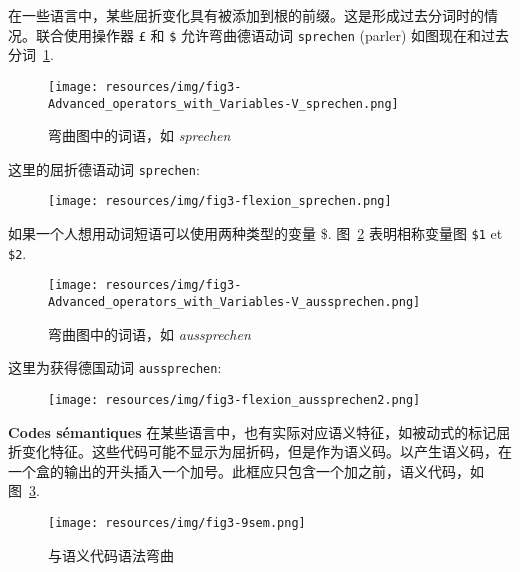 \noindent 在一些语言中，某些屈折变化具有被添加到根的前缀。这是形成过去分词时的情况。联合使用操作器 \verb+£+ 和 \verb+$+ 允许弯曲德语动词 \verb+sprechen+ (parler)
如图现在和过去分词~\ref{fig-inflection-sprechen}.

\newpage
\begin{figure}[!htbp]
\begin{center}
\texttt{[image: resources/img/fig3-Advanced\_operators\_with\_Variables-V\_sprechen.png]}
\caption{弯曲图中的词语，如 {\it sprechen}
\label{fig-inflection-sprechen}}
\end{center}
\end{figure}

\noindent 这里的屈折德语动词 \verb+sprechen+:

\bigskip
\begin{figure}[!ht]
\begin{center}
\texttt{[image: resources/img/fig3-flexion\_sprechen.png]}
\end{center}
\end{figure}

\noindent 如果一个人想用动词短语可以使用两种类型的变量 \$.
图~\ref{fig-inflection-aussprechen} 表明相称变量图 \verb+$1+ et \verb+$2+.

\bigskip
\begin{figure}[!ht]
\begin{center}
\texttt{[image: resources/img/fig3-Advanced\_operators\_with\_Variables-V\_aussprechen.png]}
\caption{弯曲图中的词语，如 {\it aussprechen}
\label{fig-inflection-aussprechen}}
\end{center}
\end{figure}

\noindent 这里为获得德国动词 \verb+aussprechen+:
\bigskip
\begin{figure}[!ht]
\begin{center}
\texttt{[image: resources/img/fig3-flexion\_aussprechen2.png]}
\end{center}
\end{figure}

\bigskip
\noindent \textbf{Codes sémantiques}
\noindent 在某些语言中，也有实际对应语义特征，如被动式的标记屈折变化特征。这些代码可能不显示为屈折码，但是作为语义码。以产生语义码，在一个盒的输出的开头插入一个加号。此框应只包含一个加之前，语义代码，如图~\ref{fig-inflection-sem}.

\bigskip
\begin{figure}[!ht]
\begin{center}
\texttt{[image: resources/img/fig3-9sem.png]}
\caption{与语义代码语法弯曲\label{fig-inflection-sem}}
\end{center}
\end{figure}

